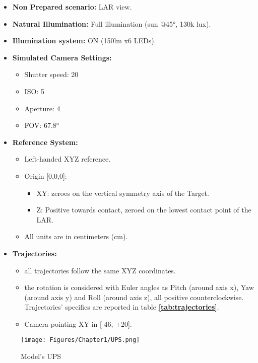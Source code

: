 \begin{itemize}
    \item \textbf{Non Prepared scenario:} LAR view.
    \item \textbf{Natural Illumination:} Full illumination (sun @45°, 130k lux).
    \item \textbf{Illumination system:} ON (150lm x6 LEDs).
    \item \textbf{Simulated Camera Settings:}
        \begin{itemize}
            \item Shutter speed: 20
            \item ISO: 5
            \item Aperture: 4
            \item FOV: 67.8°
        \end{itemize}
    \item \textbf{Reference System:}
        \begin{itemize}
            \item Left-handed XYZ reference.
            \item Origin [0,0,0]:
            \begin{itemize}
                \item XY: zeroes on the vertical symmetry axis of the Target.
                \item Z: Positive towards contact, zeroed on the lowest contact point of the LAR.
            \end{itemize}
            \item All units are in centimeters (cm).
        \end{itemize}
    \item \textbf{Trajectories:}
        \begin{itemize}
            \item all trajectories follow the same XYZ coordinates.
            \item the rotation is considered with Euler angles as Pitch (around axis x), Yaw (around axis y) and Roll (around axis z), all positive counterclockwise. Trajectories' specifics are reported in table \textbf{\ref{tab:trajectories}}.
            \item Camera pointing XY in [-46, +20].
        \end{itemize}
\end{itemize}

\begin{figure}[th]
    \centering
    \texttt{[image: Figures/Chapter1/UPS.png]}
    \caption[Model's UPS]{Model's UPS}
    \label{fig:UPS}
\end{figure}

